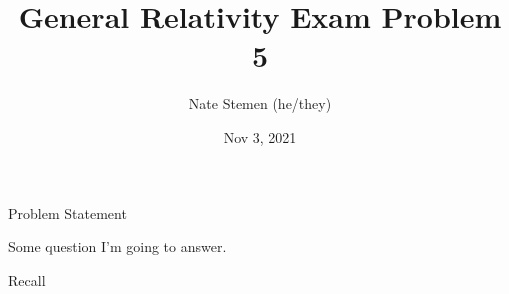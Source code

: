 \documentclass[aspectratio=1610,xcolor=dvipsnames,mathserif]{beamer}
\title{General Relativity Exam Problem 5}
\date{Nov 3, 2021}
\author{Nate Stemen (he/they)}
\institute{AMATH 875}
\newcommand{\problemstatement}{Some question I'm going to answer.}
\begin{document}
\maketitle

\begin{frame}{Problem Statement}
	\large
	\begin{prob}
		\problemstatement
	\end{prob}
\end{frame}

\begin{frame}{Recall}
\end{frame}
\end{document}
